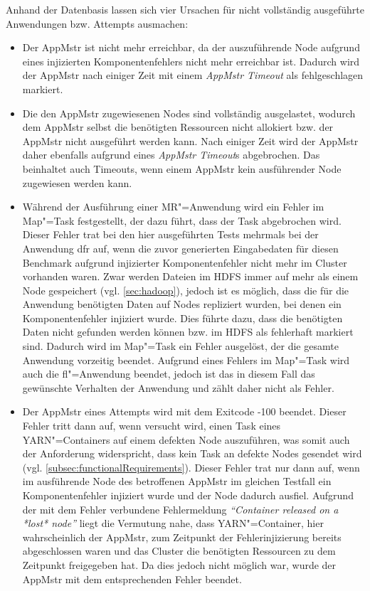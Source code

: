 Anhand der Datenbasis lassen sich vier Ursachen für nicht vollständig ausgeführte Anwendungen bzw. Attempts ausmachen:

\begin{itemize}
    \item
        Der \gls{AppMstr} ist nicht mehr erreichbar, da der auszuführende Node aufgrund eines injizierten Komponentenfehlers nicht mehr erreichbar ist.
        Dadurch wird der \gls{AppMstr} nach einiger Zeit mit einem \emph{\gls{AppMstr} Timeout} als fehlgeschlagen markiert.
    \item
        Die den \gls{AppMstr} zugewiesenen Nodes sind vollständig ausgelastet, wodurch dem \gls{AppMstr} selbst die benötigten Ressourcen nicht allokiert bzw. der \gls{AppMstr} nicht ausgeführt werden kann.
        Nach einiger Zeit wird der \gls{AppMstr} daher ebenfalls aufgrund eines \emph{\gls{AppMstr} Timeout}s abgebrochen.
        Das beinhaltet auch Timeouts, wenn einem \gls{AppMstr} kein ausführender Node zugewiesen werden kann.
    \item
        Während der Ausführung einer \gls{MR}"=Anwendung wird ein Fehler im Map"=Task festgestellt, der dazu führt, dass der Task abgebrochen wird.
        Dieser Fehler trat bei den hier ausgeführten Tests mehrmals bei der Anwendung \acrlong{dfr} auf, wenn die zuvor generierten Eingabedaten für diesen Benchmark aufgrund injizierter Komponentenfehler nicht mehr im Cluster vorhanden waren.
        Zwar werden Dateien im HDFS immer auf mehr als einem Node gespeichert (vgl. \cref{sec:hadoop}), jedoch ist es möglich, dass die für die Anwendung benötigten Daten auf Nodes repliziert wurden, bei denen ein Komponentenfehler injiziert wurde.
        Dies führte dazu, dass die benötigten Daten nicht gefunden werden können bzw. im HDFS als fehlerhaft markiert sind.
        Dadurch wird im Map"=Task ein Fehler ausgelöst, der die gesamte Anwendung vorzeitig beendet.
        Aufgrund eines Fehlers im Map"=Task wird auch die \acrlong{fl}"=Anwendung beendet, jedoch ist das in diesem Fall das gewünschte Verhalten der Anwendung und zählt daher nicht als Fehler.
    \item
        Der \gls{AppMstr} eines Attempts wird mit dem Exitcode -100 beendet.
        Dieser Fehler tritt dann auf, wenn versucht wird, einen Task eines YARN"=Containers auf einem defekten Node auszuführen, was somit auch der Anforderung widerspricht, dass kein Task an defekte Nodes gesendet wird (vgl. \cref{subsec:functionalRequirements}).
        Dieser Fehler trat nur dann auf, wenn im ausführende Node des betroffenen \gls{AppMstr} im gleichen Testfall ein Komponentenfehler injiziert wurde und der Node dadurch ausfiel.
        Aufgrund der mit dem Fehler verbundene Fehlermeldung \emph{\enquote{Container released on a *lost* node}} liegt die Vermutung nahe, dass YARN"=Container, hier wahrscheinlich der \gls{AppMstr}, zum Zeitpunkt der Fehlerinjizierung bereits abgeschlossen waren und das Cluster die benötigten Ressourcen zu dem Zeitpunkt freigegeben hat.
        Da dies jedoch nicht möglich war, wurde der \gls{AppMstr} mit dem entsprechenden Fehler beendet.
\end{itemize}

